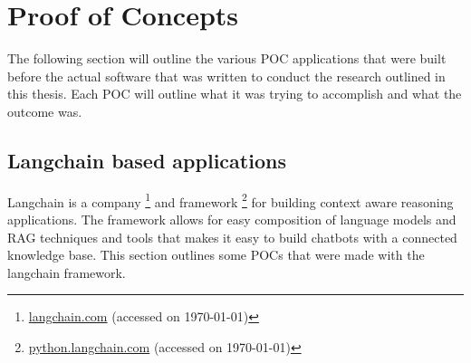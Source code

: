 ﻿%










\section{Proof of Concepts}


The following section will outline the various \gls{POC} applications that were built before the actual software that was written to conduct the research outlined in this thesis. Each \gls{POC} will outline what it was trying to accomplish and what the outcome was.


\subsection{Langchain based applications}


Langchain is a company \footnote{\href{https://langchain.com}{langchain.com} (accessed on \today)} and framework \footnote{\href{https://python.langchain.com}{python.langchain.com} (accessed on \today)} for building context aware reasoning applications. The framework allows for easy composition of language models and \gls{RAG} techniques and tools that makes it easy to build chatbots with a connected knowledge base. This section outlines some \gls{POC}s that were made with the langchain framework.


